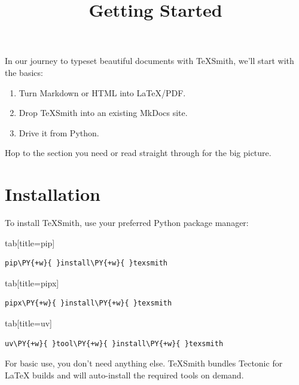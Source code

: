 \documentclass[a4paper,twoside]{article}
\title{Getting Started}
\author{}\date{}
\begin{document}
\maketitle
In our journey to typeset beautiful documents with TeXSmith, we'll start with the basics:
\begin{enumerate}
\item Turn Markdown or HTML into \LaTeX{}/PDF.
\item Drop TeXSmith into an existing MkDocs site.
\item Drive it from Python.
\end{enumerate}
Hop to the section you need or read straight through for the big picture.
\section{Installation}
To install TeXSmith, use your preferred Python package manager:
\begin{tsdiv}{tab}[title=pip]
\begin{tscode}[lang=bash, engine=pygments]
\begin{Verbatim}[commandchars=\\\{\},breaklines, breakanywhere, commandchars=\\\{\}]
pip\PY{+w}{ }install\PY{+w}{ }texsmith
\end{Verbatim}
\end{tscode}
\end{tsdiv}
\begin{tsdiv}{tab}[title=pipx]
\begin{tscode}[lang=bash, engine=pygments]
\begin{Verbatim}[commandchars=\\\{\},breaklines, breakanywhere, commandchars=\\\{\}]
pipx\PY{+w}{ }install\PY{+w}{ }texsmith
\end{Verbatim}
\end{tscode}
\end{tsdiv}
\begin{tsdiv}{tab}[title=uv]
\begin{tscode}[lang=bash, engine=pygments]
\begin{Verbatim}[commandchars=\\\{\},breaklines, breakanywhere, commandchars=\\\{\}]
uv\PY{+w}{ }tool\PY{+w}{ }install\PY{+w}{ }texsmith
\end{Verbatim}
\end{tscode}
\end{tsdiv}
For basic use, you don't need anything else. TeXSmith bundles Tectonic for \LaTeX{} builds and will auto-install the required tools on demand.
\end{document}
